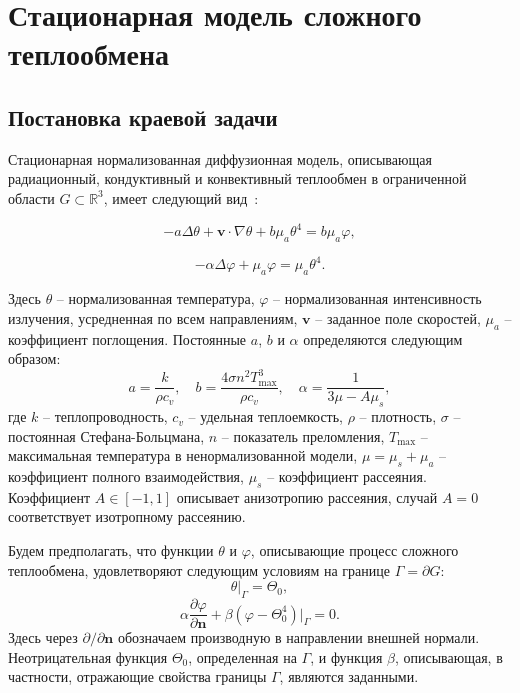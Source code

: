\section{Стационарная модель сложного теплообмена}\label{sec:ch1/sec3}

\subsection{Постановка краевой задачи}\label{subsec:ch1/sec3/state}

Стационарная нормализованная диффузионная модель, описывающая
радиационный, кондуктивный и конвективный теплообмен в
ограниченной области $G\subset \mathbb{R}^3$,
имеет следующий вид~\cite{modest2013radiative}:

\begin{equation}
    \label{eq:1_3:4-1}
    -a \Delta \theta + \textbf{v} \cdot \nabla \theta
    + b \mu_a \theta^4 =  b \mu_a \varphi,
\end{equation}

\begin{equation}
    \label{eq:1_3:4-2}
    - \alpha \Delta \varphi + \mu_a \varphi = \mu_a \theta^4.
\end{equation}

Здесь $\theta$ -- нормализованная температура, $\varphi$ --
нормализованная интенсивность излучения, усредненная по всем
направлениям, $\textbf{v}$ -- заданное поле скоростей, $\mu_a$ --
коэффициент поглощения.
Постоянные $a$, $b$ и $\alpha$
определяются следующим образом:
\[
    a=\frac{k}{\rho c_v},\quad b = \frac{4\sigma n^2 T_{\max}^3}{\rho c_v},
    \quad \alpha=\frac{1}{3\mu - A \mu_s},
\]
где $k$ -- теплопроводность, $c_v$ -- удельная теплоемкость, $\rho$ --
плотность, $\sigma$ -- постоянная Стефана-Больцмана, $n$ --
показатель преломления, $T_{\max}$ -- максимальная температура в
ненормализованной модели, $\mu = \mu_s + \mu_a$ -- коэффициент
полного взаимодействия, $\mu_s$ -- коэффициент рассеяния.
Коэффициент $A \in [-1, 1]$ описывает анизотропию рассеяния, случай
$A=0$ соответствует изотропному рассеянию.

Будем предполагать, что функции $\theta$ и $\varphi$, описывающие
процесс сложного теплообмена, удовлетворяют следующим условиям на
границе $\Gamma = \partial G$:
\begin{equation}
    \label{eq:1_3:4-3}
    \theta|_{\Gamma} = \Theta_0,
\end{equation}
\begin{equation}
    \label{eq:1_3:4-4}
    \alpha \frac{\partial \varphi}{\partial \mathbf{n}} + \beta
    (\varphi-\Theta_0^4)|_{\Gamma} = 0.
\end{equation}
Здесь через $\partial/\partial \mathbf{n}$ обозначаем производную
в направлении внешней нормали.
Неотрицательная функция
$\Theta_{0}$, определенная на $\Gamma$,  и функция $\beta$,
описывающая, в частности, отражающие свойства границы $\Gamma$,
являются заданными.


